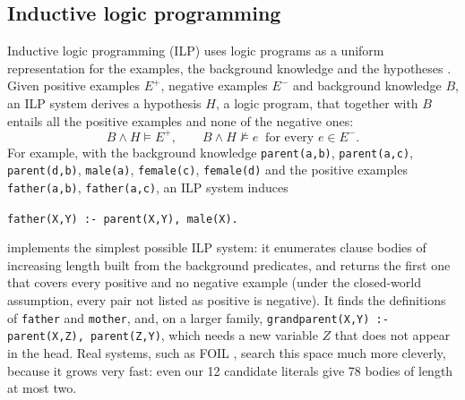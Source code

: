 \subsection{Inductive logic programming}

Inductive logic programming (ILP) uses logic programs as a uniform representation for the examples,
the background knowledge and the hypotheses \citep{muggleton1991inductive,muggleton1994inductive}. Given
positive examples $E^+$, negative examples $E^-$ and background knowledge $B$, an ILP system derives a
hypothesis $H$, a logic program, that together with $B$ entails all the positive examples and none of
the negative ones:
\begin{equation}
  B\wedge H\models E^+,\qquad B\wedge H\not\models e\ \text{ for every } e\in E^- .
\end{equation}
For example, with the background knowledge \texttt{parent(a,b)}, \texttt{parent(a,c)},
\texttt{parent(d,b)}, \texttt{male(a)}, \texttt{female(c)}, \texttt{female(d)} and the positive examples
\texttt{father(a,b)}, \texttt{father(a,c)}, an ILP system induces
\begin{center}
\texttt{father(X,Y) :- parent(X,Y), male(X).}
\end{center}
 implements the simplest possible ILP system: it enumerates clause bodies of increasing
length built from the background predicates, and returns the first one that covers every positive and
no negative example (under the closed-world assumption, every pair not listed as positive is
negative). It finds the definitions of \texttt{father} and \texttt{mother}, and, on a larger family,
\texttt{grandparent(X,Y) :- parent(X,Z), parent(Z,Y)}, which needs a new variable $Z$ that does not
appear in the head. Real systems, such as FOIL \citep{quinlan1990learning}, search this space much more
cleverly, because it grows very fast: even our 12 candidate literals give 78 bodies of length at most
two.

